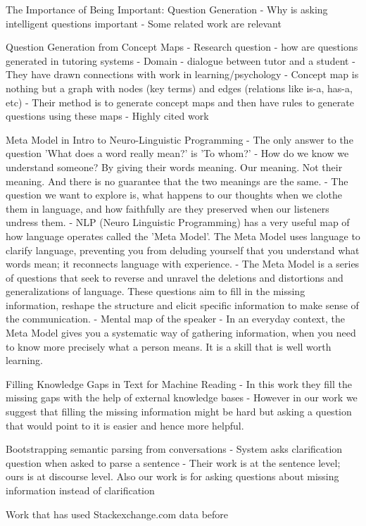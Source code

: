 \documentclass[11pt]{article}
\begin{document}
The Importance of Being Important: Question Generation 
- Why is asking intelligent questions important
- Some related work are relevant

Question Generation from Concept Maps
- Research question - how are questions generated in tutoring systems
- Domain - dialogue between tutor and a student
- They have drawn connections with work in learning/psychology
- Concept map is nothing but a graph with nodes (key terms) and edges (relations like is-a, has-a, etc)
- Their method is to generate concept maps and then have rules to generate questions using these maps
- Highly cited work

Meta Model in Intro to Neuro-Linguistic Programming
- The only answer to the question 'What does a word really mean?' is 'To whom?'
- How do we know we understand someone? By giving their words meaning. Our meaning. Not  their meaning. And there is no guarantee that the two meanings are the same.
- The question we want to explore is, what happens to our thoughts when we clothe them in language, and how faithfully are they preserved when our listeners undress them.
- NLP (Neuro Linguistic Programming) has a very useful map of how language operates called the 'Meta Model'. The Meta Model uses language to clarify language, preventing you from deluding yourself that you understand what words mean; it reconnects language with experience.
- The Meta Model is a series of questions that seek to reverse and unravel the deletions and distortions and generalizations of language. These questions aim to fill in the missing information, reshape the structure and elicit specific information to make sense of the communication.
- Mental map of the speaker
- In an everyday context, the Meta Model gives you a systematic way of gathering information, when you need to know more precisely what a person means. It is a skill that is well worth learning.

Filling Knowledge Gaps in Text for Machine Reading
- In this work they fill the missing gaps with the help of external knowledge bases
- However in our work we suggest that filling the missing information might be hard but asking a question that would point to it is easier and hence more helpful.

Bootstrapping semantic parsing from conversations
- System asks clarification question when asked to parse a sentence 
- Their work is at the sentence level; ours is at discourse level. Also our work is for asking questions about missing information instead of clarification

Work that has used Stackexchange.com data before

\fi


\end{document}
